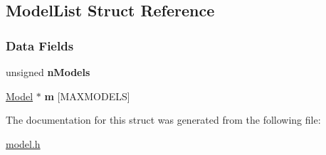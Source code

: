 \hypertarget{struct_model_list}{\subsection{\-Model\-List \-Struct \-Reference}
\label{struct_model_list}
}
\subsubsection*{\-Data \-Fields}
\begin{DoxyCompactItemize}
\item 
\hypertarget{struct_model_list_a58301ab01d8eef6ac4d0a486f89fcc08}{unsigned {\bfseries n\-Models}}\label{struct_model_list_a58301ab01d8eef6ac4d0a486f89fcc08}

\item 
\hypertarget{struct_model_list_a05ff4f000fae734e434a27b4fe016c82}{\hyperlink{struct_model}{\-Model} $\ast$ {\bfseries m} \mbox{[}\-M\-A\-X\-M\-O\-D\-E\-L\-S\mbox{]}}\label{struct_model_list_a05ff4f000fae734e434a27b4fe016c82}

\end{DoxyCompactItemize}


\-The documentation for this struct was generated from the following file\-:\begin{DoxyCompactItemize}
\item 
\hyperlink{model_8h}{model.\-h}\end{DoxyCompactItemize}
